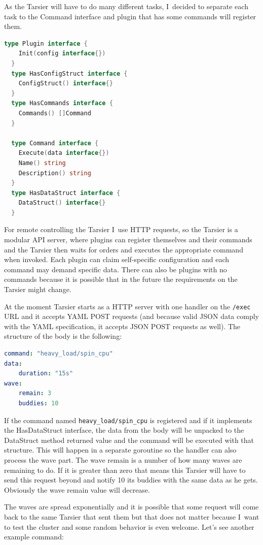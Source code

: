 As the Tarsier will have to do many different tasks, I~decided to separate each task to the Command interface and plugin that has some commands will register them.

\begin{lstlisting}[language=go,caption=Tarsier plugin's interfaces]
  type Plugin interface {
  	Init(config interface{})
  }
  type HasConfigStruct interface {
  	ConfigStruct() interface{}
  }
  type HasCommands interface {
  	Commands() []Command
  }
  
  type Command interface {
  	Execute(data interface{})
  	Name() string
  	Description() string
  }
  type HasDataStruct interface {
  	DataStruct() interface{}
  }
\end{lstlisting}

For remote controlling the Tarsier I~use HTTP requests, so the Tarsier is a modular API server, where plugins can register themselves and their commands and the Tarsier then waits for orders and executes the appropriate command when invoked. Each plugin can claim self-specific configuration and each command may demand specific data. There can also be plugins with no commands because it is possible that in the future the requirements on the Tarsier might change.

At the moment Tarsier starts as a HTTP server with one handler on the 
\lstinline{/exec} URL and it accepts YAML POST requests (and because valid JSON data comply with the YAML specification, it accepts JSON POST requests as well). The structure of the body is the following:
\pagebreak
\begin{lstlisting}[language=yaml,caption=The \lstinline{heavy_load/spin_cpu} command body structure]
command: "heavy_load/spin_cpu"
data:
    duration: "15s"
wave: 
    remain: 3
    buddies: 10
\end{lstlisting}


If the command named \lstinline{heavy_load/spin_cpu} is registered and if it implements the HasDataStruct interface, the data from the body will be unpacked to the DataStruct method returned value and the command will be executed with that structure. This will happen in a separate goroutine so the handler can also process the wave part. The wave remain is a number of how many waves are remaining to do. If it is greater than zero that means this Tarsier will have to send this request beyond and notify 10 its buddies with the same data as he gets. Obviously the wave remain value will decrease.

The waves are spread exponentially and it is possible that some request will come back to the same Tarsier that sent them but that does not matter because I~want to test the cluster and some random behavior is even welcome. Let’s see another example command:
 
